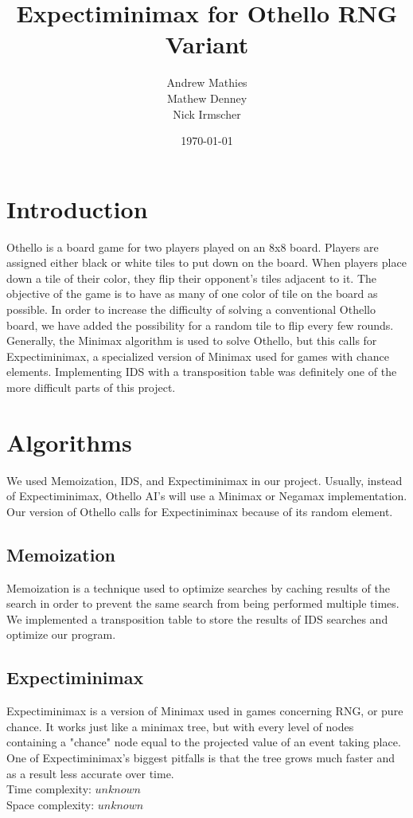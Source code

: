 \documentclass[a4paper,12pt]{article}
\title{Expectiminimax for Othello RNG Variant}
\date{\today}
\author{
	Andrew Mathies\\
	Mathew Denney\\
	Nick Irmscher
}
\begin{document}
\maketitle
\begin{spacing}{1.5}

\section{Introduction}
Othello is a board game for two players played on an 8x8 board. Players are assigned either black or white tiles to put down on the board.  When players place down a tile of their color, they flip their opponent's tiles adjacent to it.  The objective of the game is to have as many of one color of tile on the board as possible.  In order to increase the difficulty of solving a conventional Othello board, we have added the possibility for a random tile to flip every few rounds.  Generally, the Minimax algorithm is used to solve Othello, but this calls for Expectiminimax, a specialized version of Minimax used for games with chance elements.  Implementing IDS with a transposition table was definitely one of the more difficult parts of this project.

\section{Algorithms}
We used Memoization, IDS, and Expectiminimax in our project.  Usually, instead of Expectiminimax, Othello AI's will use a Minimax or Negamax implementation.  Our version of Othello calls for Expectiniminax because of its random element.
	
\subsection{Memoization}
Memoization is a technique used to optimize searches by caching results of the search in order to prevent the same search from being performed multiple times.  We implemented a transposition table to store the results of IDS searches and optimize our program.

\subsection{Expectiminimax}
	Expectiminimax is a version of Minimax used in games concerning RNG, or pure chance.  It works just like a minimax tree, but with every level of nodes containing a "chance" node equal to the projected value of an event taking place.  One of Expectiminimax's biggest pitfalls is that the tree grows much faster and as a result less accurate over time.\\[\baselineskip]
Time complexity: $ unknown $\\
Space complexity: $ unknown $



\end{spacing}
\end{document}
